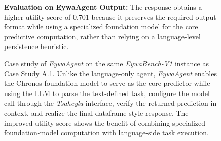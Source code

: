 \begin{figure}[h]
{\begin{tcolorbox}
\textbf{Evaluation on EywaAgent Output:}
The response obtains a higher utility score of $0.701$ because it preserves the required output format while using a specialized foundation model for the core predictive computation, rather than relying on a language-level persistence heuristic.


\end{tcolorbox}}
\caption{
Case study of \textit{EywaAgent} on the same \textit{EywaBench-V1} instance as Case Study A.1. Unlike the language-only agent, \textit{EywaAgent} enables the Chronos foundation model to serve as the core predictor while using the LLM to parse the text-defined task, configure the model call through the \textit{Tsaheylu} interface, verify the returned prediction in context, and realize the final dataframe-style response. The improved utility score shows the benefit of combining specialized foundation-model computation with language-side task execution.
}
\label{fig: case_study_eywaagent}
\end{figure}







